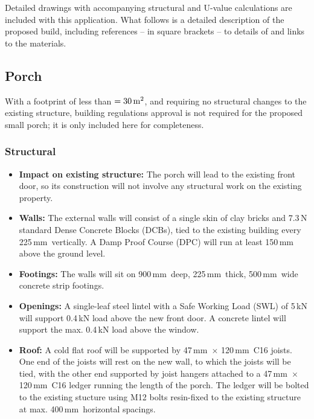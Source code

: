 \documentclass{extension}
\newcommand{\mm}{\,$\mathrm{mm}$}
\begin{document}
Detailed drawings with accompanying structural and U-value calculations are included with this application. What follows is a detailed description of the proposed build, including references -- in square brackets -- to details of and links to the materials.

\subsection{Porch}
\label{porch}
With a footprint of less than $=30\,{\rm m^2}$, and requiring no structural changes to the existing structure, building regulations approval is not required for the proposed small porch; it is only included here for completeness.
\subsubsection{Structural}
\begin{itemize}
  \item {\bf Impact on existing structure:} The porch will lead to the existing front door, so its construction will not involve any structural work on the existing property.
  \item {\bf Walls:} The external walls will consist of a single skin of clay bricks and 7.3\,N standard Dense Concrete Blocks (DCBs), tied to the existing building every 225\mm\ vertically. A Damp Proof Course (DPC) will run at least 150\,mm above the ground level.
  \item{\bf Footings:} The walls will sit on 900\mm\ deep, 225\mm\ thick, 500\mm\ wide concrete strip footings.
  \item {\bf Openings:} A single-leaf steel lintel with a Safe Working Load (SWL) of 5\,kN\cite{psteel} will support 0.4\,kN load above the new front door. A concrete lintel\cite{pconc} will support the max. 0.4\,kN load above the window.
  \item {\bf Roof:} A cold flat roof will be supported by 47\mm\ $\times$ 120\mm\ C16 joists. One end of the joists will rest on the new wall, to which the joists will be tied, with the other end supported by joist hangers attached to a 47\mm\ $\times$ 120\mm\ C16 ledger running the length of the porch. The ledger will be bolted to the existing stucture using M12 bolts resin-fixed to the existing structure at max. 400\mm\ horizontal spacings.
\end{itemize}
\end{document}
